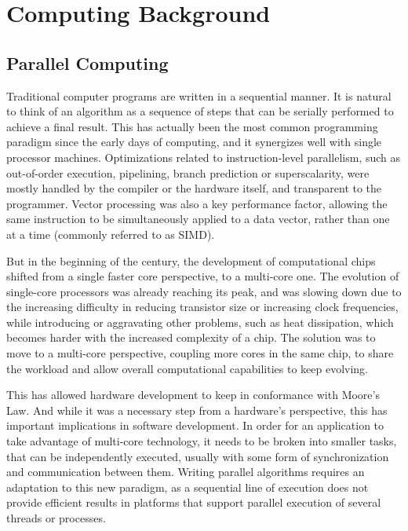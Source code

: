 \documentclass[main.tex]{subfiles}
\begin{document}
\chapter{Computing Background} \label{chapter:back}


\section{Parallel Computing}

Traditional computer programs are written in a sequential manner. It is natural to think of an algorithm as a sequence of steps that can be serially performed to achieve a final result. This has actually been the most common programming paradigm since the early days of computing, and it synergizes well with single processor machines. Optimizations related to instruction-level parallelism, such as out-of-order execution, pipelining, branch prediction or superscalarity, were mostly handled by the compiler or the hardware itself, and transparent to the programmer. Vector processing was also a key performance factor, allowing the same instruction to be simultaneously applied to a data vector, rather than one at a time (commonly referred to as \ac{SIMD}).

But in the beginning of the  century, the development of computational chips shifted from a single faster core perspective, to a multi-core one. The evolution of single-core processors was already reaching its peak, and was slowing down due to the increasing difficulty in reducing transistor size or increasing clock frequencies, while introducing or aggravating other problems, such as heat dissipation, which becomes harder with the increased complexity of a chip. The solution was to move to a multi-core perspective, coupling more cores in the same chip, to share the workload and allow overall computational capabilities to keep evolving.

This has allowed hardware development to keep in conformance with Moore's Law. And while it was a necessary step from a hardware's perspective, this has important implications in software development. In order for an application to take advantage of multi-core technology, it needs to be broken into smaller tasks, that can be independently executed, usually with some form of synchronization and communication between them. Writing parallel algorithms requires an adaptation to this new paradigm, as a sequential line of execution does not provide efficient results in platforms that support parallel execution of several threads or processes.
\end{document}
